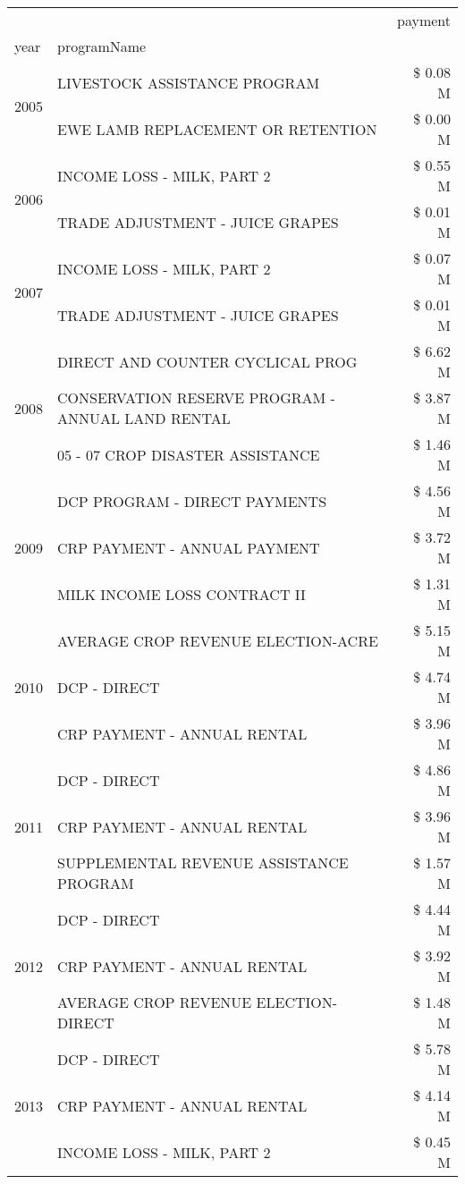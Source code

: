 \begin{tabular}{llr}
\toprule
 &  & payment \\
year & programName &  \\
\midrule
\multirow[t]{2}{*}{2005} & LIVESTOCK ASSISTANCE PROGRAM & \$ 0.08 M \\
 & EWE LAMB REPLACEMENT OR RETENTION & \$ 0.00 M \\
\cline{1-3}
\multirow[t]{2}{*}{2006} & INCOME LOSS - MILK, PART 2 & \$ 0.55 M \\
 & TRADE ADJUSTMENT - JUICE GRAPES & \$ 0.01 M \\
\cline{1-3}
\multirow[t]{2}{*}{2007} & INCOME LOSS - MILK, PART 2 & \$ 0.07 M \\
 & TRADE ADJUSTMENT - JUICE GRAPES & \$ 0.01 M \\
\cline{1-3}
\multirow[t]{3}{*}{2008} & DIRECT AND COUNTER CYCLICAL PROG & \$ 6.62 M \\
 & CONSERVATION RESERVE PROGRAM - ANNUAL LAND RENTAL & \$ 3.87 M \\
 & 05 - 07 CROP DISASTER ASSISTANCE & \$ 1.46 M \\
\cline{1-3}
\multirow[t]{3}{*}{2009} & DCP PROGRAM - DIRECT PAYMENTS & \$ 4.56 M \\
 & CRP PAYMENT - ANNUAL PAYMENT & \$ 3.72 M \\
 & MILK INCOME LOSS CONTRACT II & \$ 1.31 M \\
\cline{1-3}
\multirow[t]{3}{*}{2010} & AVERAGE CROP REVENUE ELECTION-ACRE & \$ 5.15 M \\
 & DCP - DIRECT & \$ 4.74 M \\
 & CRP PAYMENT - ANNUAL RENTAL & \$ 3.96 M \\
\cline{1-3}
\multirow[t]{3}{*}{2011} & DCP - DIRECT & \$ 4.86 M \\
 & CRP PAYMENT - ANNUAL RENTAL & \$ 3.96 M \\
 & SUPPLEMENTAL REVENUE ASSISTANCE PROGRAM & \$ 1.57 M \\
\cline{1-3}
\multirow[t]{3}{*}{2012} & DCP - DIRECT & \$ 4.44 M \\
 & CRP PAYMENT - ANNUAL RENTAL & \$ 3.92 M \\
 & AVERAGE CROP REVENUE ELECTION-DIRECT & \$ 1.48 M \\
\cline{1-3}
\multirow[t]{3}{*}{2013} & DCP - DIRECT & \$ 5.78 M \\
 & CRP PAYMENT - ANNUAL RENTAL & \$ 4.14 M \\
 & INCOME LOSS - MILK, PART 2 & \$ 0.45 M \\
\cline{1-3}

\end{tabular}
